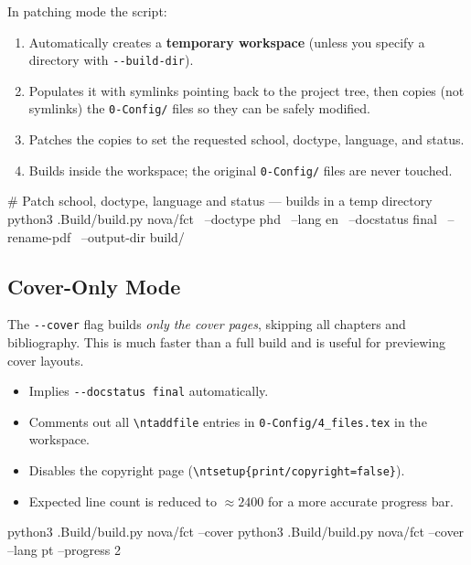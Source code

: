 In patching mode the script:

\begin{enumerate}
  \item Automatically creates a \textbf{temporary workspace} (unless you
        specify a directory with \verb!--build-dir!).
  \item Populates it with symlinks pointing back to the project tree, then
        copies (not symlinks) the \verb!0-Config/! files so they can be
        safely modified.
  \item Patches the copies to set the requested school, doctype, language,
        and status.
  \item Builds inside the workspace; the original \verb!0-Config/! files are
        never touched.
\end{enumerate}

\begin{bashcode}
# Patch school, doctype, language and status — builds in a temp directory
python3 .Build/build.py nova/fct \
    --doctype phd \
    --lang en \
    --docstatus final \
    --rename-pdf \
    --output-dir build/
\end{bashcode}

\subsection{Cover-Only Mode}
\label{sec:buildpy_cover_mode}

The \verb!--cover! flag builds \emph{only the cover pages}, skipping all
chapters and bibliography.  This is much faster than a full build and is
useful for previewing cover layouts.

\begin{itemize}
  \item Implies \verb!--docstatus final! automatically.
  \item Comments out all \verb!\ntaddfile! entries in
        \verb!0-Config/4_files.tex! in the workspace.
  \item Disables the copyright page (\verb!\ntsetup{print/copyright=false}!).
  \item Expected line count is reduced to \(\approx 2400\) for a more
        accurate progress bar.
\end{itemize}

\begin{bashcode}
python3 .Build/build.py nova/fct --cover
python3 .Build/build.py nova/fct --cover --lang pt --progress 2
\end{bashcode}


